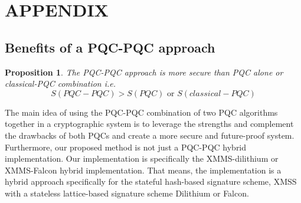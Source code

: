 \documentclass[5p,times]{elsarticle}
\newtheorem{prop}[thm]{Proposition}
\theoremstyle{definition}
\theoremstyle{remark}
\numberwithin{equation}{section}
\begin{document}
\clearpage

\section{APPENDIX}
\subsection{Benefits of a PQC-PQC approach}
\begin{prop}
The PQC-PQC approach is more secure than PQC alone or classical-PQC combination i.e.
\begin{equation}
    S(PQC-PQC) > S(PQC) \text{ or } S(classical-PQC)
\end{equation}
\end{prop}

The main idea of using the PQC-PQC combination of two PQC algorithms together in a cryptographic system is to leverage the strengths and complement the drawbacks of both PQCs and create a more secure and future-proof system.
Furthermore, our proposed method is not just a PQC-PQC hybrid implementation.
Our implementation is specifically the XMMS-dilithium or XMMS-Falcon hybrid implementation. 
That means, the implementation is a hybrid approach specifically for the stateful hash-based signature scheme, XMSS with a stateless lattice-based signature scheme Dilithium or Falcon.
\end{document}
